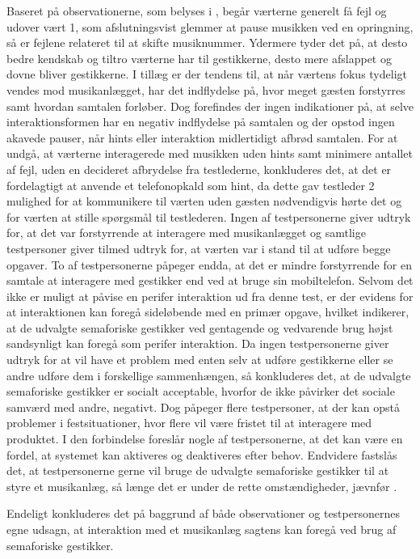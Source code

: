 Baseret på observationerne, som belyses i , begår værterne generelt få fejl og udover vært 1, som afslutningsvist glemmer at pause musikken ved en opringning, så er fejlene relateret til at skifte musiknummer. Ydermere tyder det på, at desto bedre kendskab og tiltro værterne har til gestikkerne, desto mere afslappet og dovne bliver gestikkerne. I tillæg er der tendens til, at når værtens fokus tydeligt vendes mod musikanlægget, har det indflydelse på, hvor meget gæsten forstyrres samt hvordan samtalen forløber. Dog forefindes der ingen indikationer på, at selve interaktionsformen har en negativ indflydelse på samtalen og der opstod ingen akavede pauser, når hints eller interaktion midlertidigt afbrød samtalen. For at undgå, at værterne interagerede med musikken uden hints samt minimere antallet af fejl, uden en decideret afbrydelse fra testlederne, konkluderes det, at det er fordelagtigt at anvende et telefonopkald som hint, da dette gav testleder 2 mulighed for at kommunikere til værten uden gæsten nødvendigvis hørte det og for værten at stille spørgsmål til testlederen.\blankline
%
Ingen af testpersonerne giver udtryk for, at det var forstyrrende at interagere med musikanlægget og samtlige testpersoner giver tilmed udtryk for, at værten var i stand til at udføre begge opgaver. To af testpersonerne påpeger endda, at det er mindre forstyrrende for en samtale at interagere med gestikker end ved at bruge sin mobiltelefon. Selvom det ikke er muligt at påvise en perifer interaktion ud fra denne test, er der evidens for at interaktionen kan foregå sideløbende med en primær opgave, hvilket indikerer, at de udvalgte semaforiske gestikker ved gentagende og vedvarende brug højst sandsynligt kan foregå som perifer interaktion. \blankline
%
Da ingen testpersonerne giver udtryk for at vil have et problem med enten selv at udføre gestikkerne eller se andre udføre dem i forskellige sammenhængen, så konkluderes det, at de udvalgte semaforiske gestikker er socialt acceptable, hvorfor de ikke påvirker det sociale samværd med andre, negativt. Dog påpeger flere testpersoner, at der kan opstå problemer i festsituationer, hvor flere vil være fristet til at interagere med produktet. I den forbindelse foreslår nogle af testpersonerne, at det kan være en fordel, at systemet kan aktiveres og deaktiveres efter behov. Endvidere fastslås det, at testpersonerne gerne vil bruge de udvalgte semaforiske gestikker til at styre et musikanlæg, så længe det er under de rette omstændigheder, jævnfør .  

Endeligt konkluderes det på baggrund af både observationer og testpersonernes egne udsagn, at interaktion med et musikanlæg sagtens kan foregå ved brug af semaforiske gestikker.



